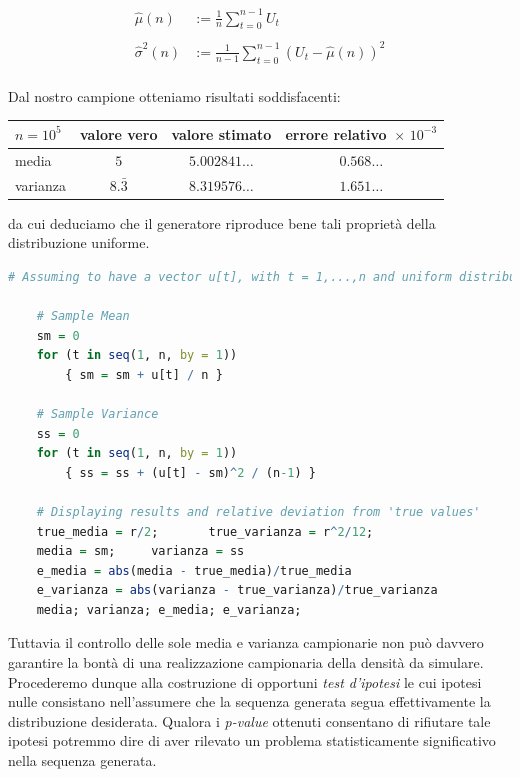 \begin{align*}
\hat{\mu}(n) &:= \frac{1}{n}\sum_{t=0}^{n-1} U_t \\ \\
\hat{\sigma}^2(n) &:= \frac{1}{n-1}\sum_{t=0}^{n-1} \left(U_t - \hat{\mu}(n)\right)^2\\
\end{align*}

\noindent Dal nostro campione otteniamo risultati soddisfacenti:

\bgroup
\def\arraystretch{1.5}
\begin{center}
\begin{tabular}{l||c|c|c}
	$n=10^5$&valore vero&valore stimato&errore relativo $\!\times\,10^{-3}$\\ \hline
	media&$5$&$5.002841\dots$&$0.568\dots $\\
	varianza&$8.\bar{3}$&$8.319576\dots$&$1.651\dots$\\	
\end{tabular}
\end{center}
\egroup

\noindent da cui deduciamo che il generatore riproduce bene tali proprietà della distribuzione uniforme.\\

\begin{lstlisting}[language=R, style=Rstyle, caption= \texttt{R} code for computing non-biased variance and mean predictors, xleftmargin=.02\textwidth]
# Assuming to have a vector u[t], with t = 1,...,n and uniform distributed in [0,r]

	# Sample Mean
	sm = 0
	for (t in seq(1, n, by = 1))
		{ sm = sm + u[t] / n }
	
	# Sample Variance
	ss = 0
	for (t in seq(1, n, by = 1))
		{ ss = ss + (u[t] - sm)^2 / (n-1) }
		
	# Displaying results and relative deviation from 'true values'
	true_media = r/2;		true_varianza = r^2/12;
	media = sm;		varianza = ss
	e_media = abs(media - true_media)/true_media
	e_varianza = abs(varianza - true_varianza)/true_varianza
	media; varianza; e_media; e_varianza;
\end{lstlisting}

\noindent Tuttavia il controllo delle sole media e varianza campionarie non può davvero garantire la bontà di una realizzazione campionaria della densità da simulare. Procederemo dunque alla costruzione di opportuni \emph{test d'ipotesi} le cui ipotesi nulle consistano nell'assumere che la sequenza generata segua effettivamente la distribuzione desiderata. Qualora i \emph{p-value} ottenuti consentano di rifiutare tale ipotesi potremmo dire di aver rilevato un problema statisticamente significativo nella sequenza generata.

